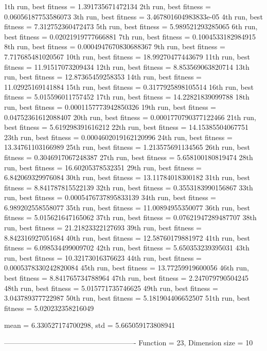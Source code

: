 1th run, best fitness = 1.391735671472134
2th run, best fitness = 0.06056187753586073
3th run, best fitness = 3.467801604983833e-05
4th run, best fitness = 7.312752360472473
5th run, best fitness = 5.989521293285065
6th run, best fitness = 0.02021919777666881
7th run, best fitness = 0.1004533182984915
8th run, best fitness = 0.0004947670830688367
9th run, best fitness = 7.717685481020567
10th run, best fitness = 18.99270477443679
11th run, best fitness = 11.91517073209434
12th run, best fitness = 8.853569063820714
13th run, best fitness = 12.87365459258353
14th run, best fitness = 11.02925169141884
15th run, best fitness = 0.3177925898105514
16th run, best fitness = 5.015596011757452
17th run, best fitness = 14.22821839099788
18th run, best fitness = 0.0001157773942850326
19th run, best fitness = 0.04752361612088407
20th run, best fitness = 0.0001770790377122466
21th run, best fitness = 5.619298391616212
22th run, best fitness = 14.15385504067751
23th run, best fitness = 0.0004602019162120996
24th run, best fitness = 13.34761103166989
25th run, best fitness = 1.213575691134565
26th run, best fitness = 0.3046917067248387
27th run, best fitness = 5.658100180819474
28th run, best fitness = 16.60205378532351
29th run, best fitness = 6.842069329976084
30th run, best fitness = 13.11784018300182
31th run, best fitness = 8.841787815522139
32th run, best fitness = 0.3553183990156867
33th run, best fitness = 0.0005476737895833139
34th run, best fitness = 6.989202558558077
35th run, best fitness = 11.00894955350077
36th run, best fitness = 5.015621647165062
37th run, best fitness = 0.07621947289487707
38th run, best fitness = 21.21823322127693
39th run, best fitness = 8.842316927051684
40th run, best fitness = 12.58760179881972
41th run, best fitness = 6.098534499009702
42th run, best fitness = 5.650353239395031
43th run, best fitness = 10.32173016376623
44th run, best fitness = 0.0005378330242820084
45th run, best fitness = 13.77259919600056
46th run, best fitness = 8.841765734788964
47th run, best fitness = 2.247079790504245
48th run, best fitness = 5.015771735746625
49th run, best fitness = 3.043789377722987
50th run, best fitness = 5.181904406652507
51th run, best fitness = 5.020232358216049

mean = 6.330527174700298, std = 5.665059173808941

-------------------------------------------------------
Function = 23, Dimension size = 10

